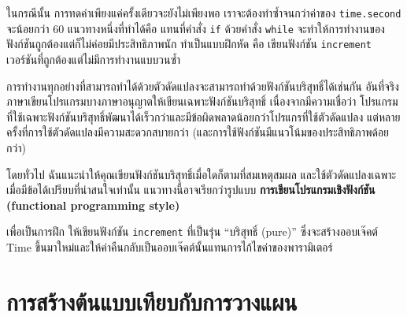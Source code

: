 ในกรณีนั้น การทดค่าเพียงแค่ครั้งเดียวจะยังไม่เพียงพอ เราจะต้องทำซ้ำจนกว่าค่าของ {\tt time.second} จะน้อยกว่า 60 
แนวทางหนึ่งที่ทำได้คือ แทนที่คำสั่ง  {\tt if} ด้วยคำสั่ง {\tt while} จะทำให้การทำงานของฟังก์ชันถูกต้องแต่ก็ไม่ค่อยมีประสิทธิภาพนัก 
ทำเป็นแบบฝึกหัด คือ เขียนฟังก์ชัน {\tt increment} เวอร์ชันที่ถูกต้องแต่ไม่มีการทำงานแบบวนซ้ำ



การทำงานทุกอย่างที่สามารถทำได้ด้วยตัวดัดแปลงจะสามารถทำด้วยฟังก์ชันบริสุทธิ์ได้เช่นกัน 
อันที่จริงภาษาเขียนโปรแกรมบางภาษาอนุญาตให้เขียนเฉพาะฟังก์ชันบริสุทธิ์ เนื่องจากมีความเชื่อว่า 
โปรแกรมที่ใช้เฉพาะฟังก์ชันบริสุทธิ์พัฒนาได้เร็วกว่าและมีข้อผิดพลาดน้อยกว่าโปรแกรที่ใช้ตัวดัดแปลง 
แต่หลายครั้งที่การใช้ตัวดัดแปลงมีความสะดวกสบายกว่า (และการใช้ฟังก์ชันมีแนวโน้มของประสิทธิภาพด้อยกว่า)



โดยทั่วไป ฉันแนะนำให้คุณเขียนฟังก์ชันบริสุทธิ์เมื่อใดก็ตามที่สมเหตุสมผล และใช้ตัวดัดแปลงเฉพาะเมื่อมีข้อได้เปรียบที่น่าสนใจเท่านั้น 
แนวทางนี้อาจเรียกว่ารูปแบบ {\bf การเขียนโปรแกรมเชิงฟังก์ชัน (functional programming style)}


เพื่อเป็นการฝึก ให้เขียนฟังก์ชัน {\tt increment} ที่เป็นรุ่น ``บริสุทธิ์ (pure)'' 
ซึ่งจะสร้างออบเจ๊คต์ Time ขึ้นมาใหม่และให้ค่าคืนกลับเป็นออบเจ๊คต์นั้นแทนการไก้ไขค่าของพารามิเตอร์

\section{การสร้างต้นแบบเทียบกับการวางแผน} %
\label{prototype}

